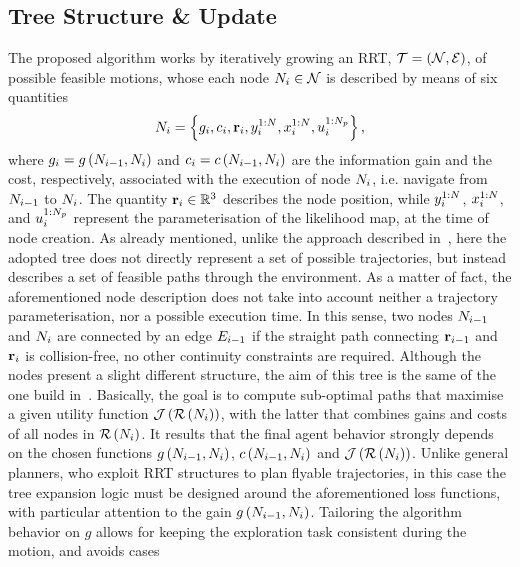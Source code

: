 \subsection{Tree Structure \& Update}%
\label{SEC:SEARCH-TREE-STRUCTURE}
The proposed algorithm works by iteratively growing an RRT, $\mathcal{T} = \left( \mathcal{N}, \mathcal{E} \right)$, of possible feasible motions,
whose each node $N_i \in \mathcal{N}$ is described by means of six quantities
\begin{equation*}
	N_i = \left\{ g_i, c_i, \mathbf{r}_i, y_i^{1:N}, x_i^{1:N}, u_i^{1:N_p} \right\},
\end{equation*}
where $g_i = g\left( N_{i-1}, N_i \right)$ and $c_i = c\left( N_{i-1}, N_i \right)$ are the information gain and the cost,
respectively, associated with the execution of node $N_i$, i.e. navigate from $N_{i-1}$ to $N_i$.
The quantity $\mathbf{r}_i \in \mathbb{R}^3$ describes the node position, while $y_i^{1:N}$, $x_i^{1:N}$,
and $u_i^{1:N_p}$ represent the parameterisation of the likelihood map, at the time of node creation.
As already mentioned, unlike the approach described in~, here the adopted tree does not directly
represent a set of possible trajectories, but instead describes a set of feasible paths through the environment.
As a matter of fact, the aforementioned node description does not take into account neither a trajectory parameterisation, nor a
possible execution time. In this sense, two nodes $N_{i-1}$ and $N_i$ are connected by an edge $E_{i-1}$ if the straight path
connecting $\mathbf{r}_{i-1}$ and $\mathbf{r}_i$ is collision-free, no other continuity constraints are required.
Although the nodes present a slight different structure, the aim of this tree is the same of the one build in~.
Basically, the goal is to compute sub-optimal paths that maximise a given utility function $\mathcal{J} \left( \mathcal{R} \left( N_i \right) \right)$, with
the latter that combines gains and costs of all nodes in $\mathcal{R} \left( N_i \right)$. It results that the final agent behavior strongly depends
on the chosen functions $g \left( N_{i-1}, N_i \right)$, $c \left( N_{i-1}, N_i \right)$ and $\mathcal{J} \left( \mathcal{R} \left( N_i \right) \right)$.
Unlike general planners, who exploit RRT structures to plan flyable trajectories, in this case the tree expansion logic
must be designed around the aforementioned loss functions, with particular attention to the gain $g \left( N_{i-1}, N_i \right)$.
Tailoring the algorithm behavior on $g$ allows for keeping the exploration task consistent during the motion, and avoids cases
